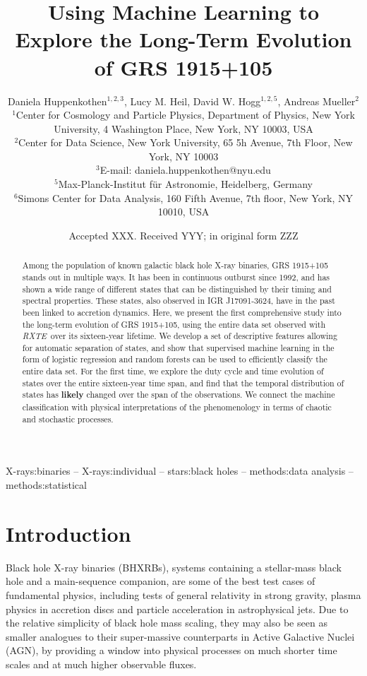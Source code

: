 \documentclass[fleqn,usenatbib]{mnras}
\title[The Long-Term Evolution of GRS 1915+105]{Using Machine Learning to Explore the Long-Term Evolution of GRS 1915+105}
\author[D. Huppenkothen et al.]{Daniela Huppenkothen$^{1, 2, 3}$, Lucy M. Heil, David W. Hogg$^{1,2,5}$, Andreas Mueller$^{2}$
\\
   $^{1}$Center for Cosmology and Particle Physics, Department of Physics, New York University, 4 Washington Place, New York, NY 10003, USA \\
  $^{2}$Center for Data Science, New York University, 65 5h Avenue, 7th Floor, New York, NY 10003 \\
 $^{3}$E-mail: daniela.huppenkothen@nyu.edu \\
  $^{5}$Max-Planck-Institut f\"{u}r Astronomie, Heidelberg, Germany \\
  $^{6}$Simons Center for Data Analysis, 160 Fifth Avenue, 7th floor, New York, NY 10010, USA
}
\date{Accepted XXX. Received YYY; in original form ZZZ}
\newcommand{\project}[1]{\textsl{#1}}
\newcommand{\rxte}{\project{RXTE}}
\begin{document}
\label{firstpage}
\pagerange{\pageref{firstpage}--\pageref{lastpage}}
\maketitle

\begin{abstract}
Among the population of known galactic black hole X-ray binaries, GRS 1915+105 stands out in multiple ways. It has been in continuous outburst since 1992, and has shown a wide range of different states that can be distinguished by their timing and spectral properties. These states, also observed in IGR J17091-3624, have in the past been linked to accretion dynamics. %
Here, we present the first comprehensive study into the long-term evolution of GRS 1915+105, using the entire data set observed with \rxte\ over its sixteen-year lifetime. We develop a set of descriptive features allowing for automatic separation of states, and show that supervised machine learning in the form of logistic regression and random forests can be used to efficiently classify the entire data set. For the first time, we explore the duty cycle and time evolution of states over the entire sixteen-year time span, and find that the temporal distribution of states has \textbf{likely} changed over the span of the observations. We connect the machine classification with physical interpretations of the phenomenology in terms of chaotic and stochastic processes.
\end{abstract}

\begin{keywords}
X-rays:binaries -- X-rays:individual -- stars:black holes -- methods:data analysis -- methods:statistical
\end{keywords}



\section{Introduction}
Black hole X-ray binaries (BHXRBs), systems containing a stellar-mass black hole and a main-sequence companion, are some of the best test cases of fundamental physics, including tests of general relativity in strong gravity, plasma physics in accretion discs and particle acceleration in astrophysical jets. 
Due to the relative simplicity of black hole mass scaling, they may also be seen as smaller analogues to their super-massive counterparts in Active Galactive Nuclei (AGN), by providing a window into physical processes on much shorter time scales and at much higher observable fluxes.
\end{document}
